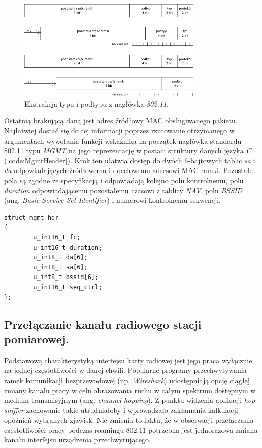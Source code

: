 \begin{figure}[htb]
\begin{center}
\includegraphics[width=333px]{img/TypeSubtype}
\caption{Ekstrakcja typu i podtypu z nagłówka \emph{802.11}.}
\label{TypeSubtype}
\end{center}
\end{figure}

Ostatnią brakującą daną jest adres źródłowy MAC obsługiwanego pakietu. Najłatwiej dostać się do tej informacji poprzez rzutowanie otrzymanego w argumentach wywołania funkcji wskaźnika na początek nagłówka standardu 802.11 typu \emph{MGMT} na jego reprezentację w postaci struktury danych języka \emph{C} (\ref{code:MgmtHeader}). Krok ten ułatwia dostęp do dwóch 6-bajtowych tablic \emph{sa} i \emph{da} odpowiadających źródłowemu i docelowemu adresowi MAC ramki. Pozostałe pola są zgodne ze specyfikacją i odpowiadają kolejno polu kontrolnemu, polu \emph{duration} odpowiadającemu pozostałemu czasowi z tablicy \emph{NAV}, polu \emph{BSSID} (ang. \emph{Basic Service Set Identifier}) i numerowi kontrolnemu sekwencji.

\begin{lstlisting}[frame=tb]
struct mgmt_hdr
{
        u_int16_t fc;
        u_int16_t duration;
        u_int8_t da[6];
        u_int8_t sa[6];
        u_int8_t bssid[6];
        u_int16_t seq_ctrl;
};
\end{lstlisting}



\subsection{Przełączanie kanału radiowego stacji pomiarowej.}

Podstawową charakterystyką interfejsu karty radiowej jest jego praca wyłącznie na jednej częstotliwości w danej chwili. Popularne programy przechwytywania ramek komunikacji bezprzewodowej (np. \emph{Wireshark}) udostępniają opcję ciągłej zmiany kanału pracy w celu obrazowania ruchu w całym spektrum dostępnym w medium transmisyjnym (ang. \emph{channel hopping}). Z punktu widzenia aplikacji \emph{hop-sniffer} zachowanie takie utrudniałoby i wprowadzało zakłamania kalkulacji opóźnień wybranych zjawisk. Nie zmienia to faktu, że w obserwacji przełączania częstotliwości pracy podczas roamingu 802.11 potrzebna jest jednorazowa zmiana kanału interfejsu urządzenia przechwytującego.     

